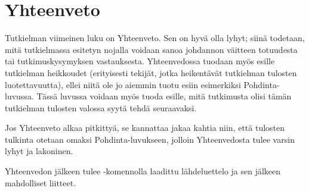 \documentclass[utf8]{gradu3}
\begin{document}
\chapter{Yhteenveto}

Tutkielman viimeinen luku on Yhteenveto.  Sen on hyvä olla lyhyt; siinä todetaan, mitä tutkielmassa esitetyn nojalla voidaan sanoa johdannon väitteen totuudesta tai tutkimuskysymyksen vastauksesta. Yhteenvedossa tuodaan myös esille tutkielman heikkoudet (erityisesti tekijät, jotka heikentävät tutkielman tulosten luotettavuutta), ellei niitä ole jo aiemmin tuotu esiin esimerkiksi Pohdinta-luvussa. Tässä luvussa voidaan myös tuoda esille, mitä tutkimusta olisi tämän
tutkielman tulosten valossa syytä tehdä seuraavaksi.

Jos Yhteenveto alkaa pitkittyä, se kannattaa jakaa kahtia niin, että tulosten tulkinta otetaan omaksi Pohdinta-luvukseen, jolloin Yhteenvedosta tulee varsin lyhyt ja lakoninen.

Yhteenvedon jälkeen tulee \string\printbibliography-komennolla laadittu lähdeluettelo ja sen jälkeen mahdolliset liitteet.


\printbibliography

%

\appendix
\end{document}

